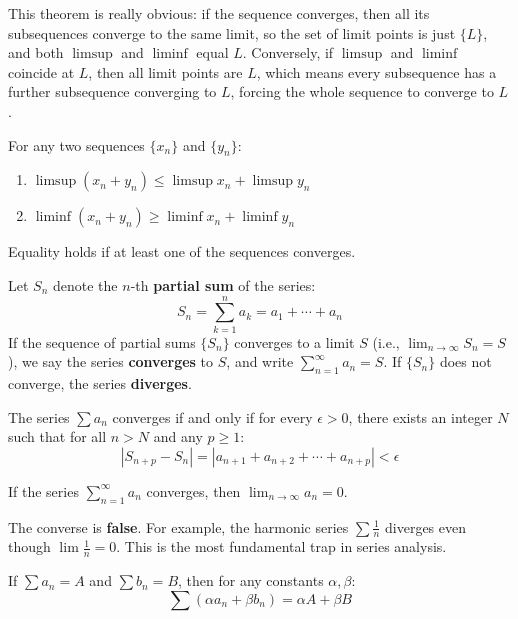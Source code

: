This theorem is really obvious: if the sequence converges, then all its subsequences converge to the same limit, so the set of limit points is just $\{L\}$, and both $\limsup$ and $\liminf$ equal $L$. Conversely, if $\limsup$ and $\liminf$ coincide at $L$, then all limit points are $L$, which means every subsequence has a further subsequence converging to $L$, forcing the whole sequence to converge to $L$.

\begin{property}
For any two sequences $\{x_n\}$ and $\{y_n\}$:
\begin{enumerate}
    \item $\limsup (x_n + y_n) \le \limsup x_n + \limsup y_n$
    \item $\liminf (x_n + y_n) \ge \liminf x_n + \liminf y_n$
\end{enumerate}
Equality holds if at least one of the sequences converges.
\end{property}

\begin{definition}[Convergence]
Let $S_n$ denote the $n$-th \textbf{partial sum} of the series:
\[ S_n = \sum_{k=1}^{n} a_k = a_1 + \cdots + a_n \]
If the sequence of partial sums $\{S_n\}$ converges to a limit $S$ (i.e., $\lim_{n \to \infty} S_n = S$), we say the series \textbf{converges} to $S$, and write $\sum_{n=1}^{\infty} a_n = S$.
If $\{S_n\}$ does not converge, the series \textbf{diverges}.
\end{definition}

\begin{theorem}
The series $\sum a_n$ converges if and only if for every $\epsilon > 0$, there exists an integer $N$ such that for all $n > N$ and any $p \ge 1$:
\[ |S_{n+p} - S_n| = |a_{n+1} + a_{n+2} + \cdots + a_{n+p}| < \epsilon \]
\end{theorem}

\begin{theorem}
If the series $\sum_{n=1}^{\infty} a_n$ converges, then $\lim_{n \to \infty} a_n = 0$.
\end{theorem}

The converse is \textbf{false}. For example, the harmonic series $\sum \frac{1}{n}$ diverges even though $\lim \frac{1}{n} = 0$. This is the most fundamental trap in series analysis.


\begin{property}[Linearity]
If $\sum a_n = A$ and $\sum b_n = B$, then for any constants $\alpha, \beta$:
\[ \sum (\alpha a_n + \beta b_n) = \alpha A + \beta B \]
\end{property}

